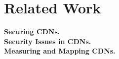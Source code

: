 \section{Related Work}
\label{sec:related}


{\bf Securing CDNs.} ~\cite{lesniewski2005ssl,michalakis2007ensuring,levy2015stickler,gilad2016cdn}\\
{\bf Security Issues in CDNs.} ~\cite{chen2016forwarding,triukose2009content,su2008thinning,liang2014https,jia2016anonymity,zolfaghari2016practical,jung2002flash}\\
{\bf Measuring and Mapping CDNs.} ~\cite{calder2013mapping,huang2008measuring,su2009drafting,scott2016satellite,wendell2011going,xue2017cdns,berger2017adaptsize}


